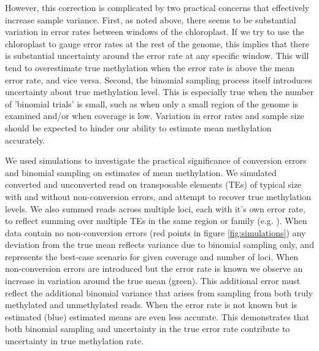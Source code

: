 \documentclass[twocolumn,twoside,lettersize]{article}
\begin{document}
However, this correction is complicated by two practical concerns that effectively increase sample variance.
First, as noted above, there seems to be substantial variation in error rates between windows of the chloroplast.
If we try to use the chloroplast to gauge error rates at the rest of the genome, this implies that there is substantial uncertainty around the error rate at any specific window.
This will tend to overestimate true methylation when the error rate is above the mean error rate, and vice versa.
Second, the binomial sampling process itself introduces uncertainty about true methylation level.
This is especially true when the number of 'binomial trials' is small, such as when only a small region of the genome is examined and/or when coverage is low.
Variation in error rates and sample size should be expected to hinder our ability to estimate mean methylation accurately.

We used simulations to investigate the practical significance of conversion errors and binomial sampling on estimates of mean methylation.
We simulated converted and unconverted read on transposable elements (TEs) of typical size with and without non-conversion errors, and attempt to recover true methylation levels.
We also summed reads across multiple loci, each with it's own error rate, to reflect summing over multiple TEs in the same region or family (e.g. \cite{sasaki2019common}).
When data contain no non-conversion errors (red points in figure \ref{fig:simulations}) any deviation from the true mean reflects variance due to binomial sampling only, and represents the best-case scenario for given coverage and number of loci.
When non-conversion errors are introduced but the error rate is known we observe an increase in variation around the true mean (green).
This additional error must reflect the additional binomial variance that arises from sampling from both truly methylated and unmethylated reads.
When the error rate is not known but is estimated (blue) estimated means are even less accurate.
This demonstrates that both binomial sampling and uncertainty in the true error rate contribute to uncertainty in true methylation rate.
\end{document}
